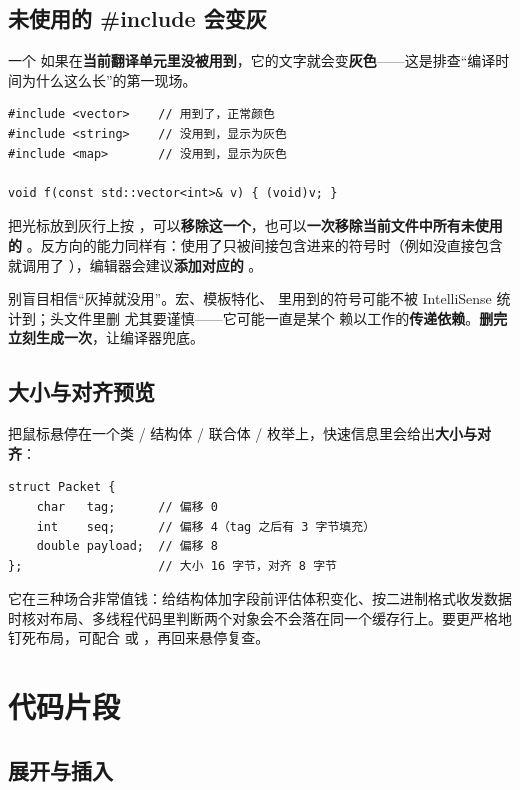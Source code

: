 \subsection{未使用的 \#include 会变灰}

一个  如果在\textbf{当前翻译单元里没被用到}，它的文字就会变\textbf{灰色}——这是排查“编译时间为什么这么长”的第一现场。

\begin{lstlisting}[style=cppstyle]
#include <vector>    // 用到了，正常颜色
#include <string>    // 没用到，显示为灰色
#include <map>       // 没用到，显示为灰色

void f(const std::vector<int>& v) { (void)v; }
\end{lstlisting}
把光标放到灰行上按 ，可以\textbf{移除这一个}，也可以\textbf{一次移除当前文件中所有未使用的 }。反方向的能力同样有：使用了只被间接包含进来的符号时（例如没直接包含  就调用了 ），编辑器会建议\textbf{添加对应的 }。

\begin{warnbox}[注意]
别盲目相信“灰掉就没用”。宏、模板特化、 里用到的符号可能不被 IntelliSense 统计到；头文件里删  尤其要谨慎——它可能一直是某个  赖以工作的\textbf{传递依赖}。\textbf{删完立刻生成一次}，让编译器兜底。
\end{warnbox}

\subsection{大小与对齐预览}

把鼠标悬停在一个类 / 结构体 / 联合体 / 枚举上，快速信息里会给出\textbf{大小与对齐}：

\begin{lstlisting}[style=cppstyle]
struct Packet {
    char   tag;      // 偏移 0
    int    seq;      // 偏移 4（tag 之后有 3 字节填充）
    double payload;  // 偏移 8
};                   // 大小 16 字节，对齐 8 字节
\end{lstlisting}
它在三种场合非常值钱：给结构体加字段前评估体积变化、按二进制格式收发数据时核对布局、多线程代码里判断两个对象会不会落在同一个缓存行上。要更严格地钉死布局，可配合  或 ，再回来悬停复查。

\section{代码片段}
\subsection{展开与插入}

